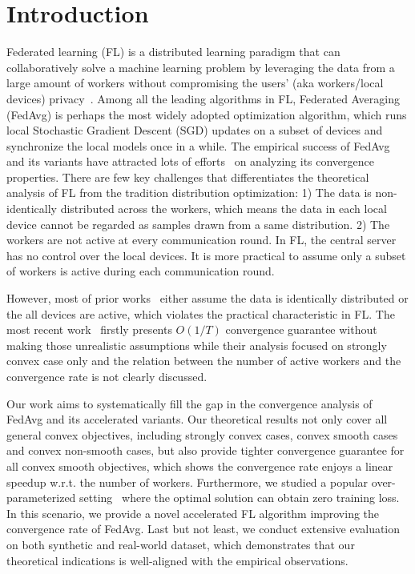 

\section{Introduction}
Federated learning (FL) is a distributed learning paradigm that can collaboratively solve a machine learning problem by leveraging the data
from a large amount of workers without compromising the users' (aka workers/local devices) privacy~\cite{kairouz2019advances}. 
Among all the leading algorithms in FL, Federated Averaging~\cite{mcmahan2016communication} (FedAvg)
is perhaps the most widely adopted optimization algorithm, which runs local
Stochastic Gradient Descent (SGD) updates on a subset of devices
and synchronize the local models once in a while. 
The empirical success of FedAvg and its variants have
attracted lots of efforts~\cite{li2018federated,stich2018local,khaled2019first,yu2019parallel,haddadpour2019convergence,li2019convergence,huo2020faster} on analyzing its convergence properties. 
There are few key challenges that differentiates the theoretical analysis
of FL from the tradition distribution optimization: 
1) The data is non-identically distributed across the workers, which means the
data in each local device cannot be regarded as samples drawn from
a same distribution. 
2) The workers are not active at every communication
round. In FL, the central server has no control over the local devices. 
It is more practical to assume only a subset of workers is active during
each communication round. 

However, most of prior works~\cite{li2018federated,stich2018local,khaled2019first,yu2019parallel,haddadpour2019convergence} either assume
the data is identically distributed or the all devices are active, which
violates the practical characteristic in FL. The most recent work~\cite{li2019convergence} firstly presents $O(1/T)$ convergence guarantee without 
making those unrealistic assumptions while their analysis focused 
on strongly convex case only and the relation between the number of active
workers and the convergence rate is not clearly discussed. 

Our work aims to systematically fill the gap in the convergence analysis
of FedAvg and its accelerated variants. 
Our theoretical results not only cover all general convex objectives, including strongly convex cases, convex smooth cases and convex non-smooth cases, but also provide tighter convergence guarantee for all convex smooth objectives, which shows the convergence rate enjoys a linear speedup w.r.t.
the number of workers.
Furthermore, we studied a popular over-parameterized setting~\cite{liu2018accelerating} where the optimal solution can obtain zero training loss. In this scenario, we provide a novel accelerated FL algorithm improving
the convergence rate of FedAvg. Last but not least, we conduct extensive
evaluation on both synthetic and real-world dataset, which demonstrates that our theoretical indications is well-aligned with the empirical observations.


